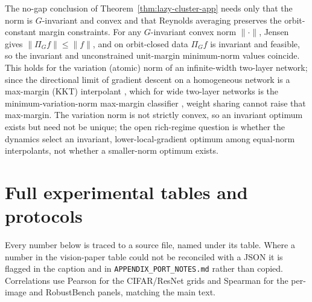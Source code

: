 \begin{corollary}\label{cor:no-gap-var-app}
The no-gap conclusion of Theorem~\ref{thm:lazy-cluster-app} needs only that the
norm is $G$-invariant and convex and that Reynolds averaging preserves the
orbit-constant margin constraints. For any $G$-invariant convex norm
$\lVert\cdot\rVert$, Jensen gives $\lVert\Pi_Gf\rVert\le\lVert f\rVert$, and on
orbit-closed data $\Pi_Gf$ is invariant and feasible, so the invariant and
unconstrained unit-margin minimum-norm values coincide. This holds for the
variation (atomic) norm of an infinite-width two-layer network; since the
directional limit of gradient descent on a homogeneous network is a max-margin
(KKT) interpolant \citep{lyu2020gradient,ji2020directional}, which for wide
two-layer networks is the minimum-variation-norm max-margin classifier
\citep{chizat2020implicit}, weight sharing cannot raise that max-margin. The
variation norm is not strictly convex, so an invariant optimum exists but need
not be unique; the open rich-regime question is whether the dynamics select an
invariant, lower-local-gradient optimum among equal-norm interpolants, not
whether a smaller-norm optimum exists.
\end{corollary}

\section{Full experimental tables and protocols}\label{app:extra}
Every number below is traced to a source file, named under its table. Where a
number in the vision-paper table could not be reconciled with a JSON it is
flagged in the caption and in \texttt{APPENDIX\_PORT\_NOTES.md} rather than
copied. Correlations use Pearson for the CIFAR/ResNet grids and Spearman for the
per-image and RobustBench panels, matching the main text.

